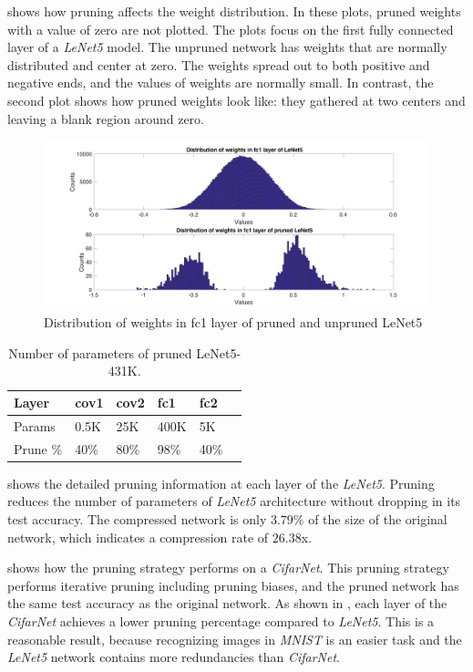 \documentclass[a4paper,12pt]{report}
\begin{document}
 shows how pruning affects the weight distribution.
In these plots, pruned weights with a value of zero are not plotted.
The plots focus on the first fully connected layer of a \textit{LeNet5} model.
The unpruned network has weights that are normally distributed and
center at zero.
The weights spread out to both positive and negative ends, and the values of
weights are normally small.
In contrast, the second plot shows how pruned weights look like: they gathered
at two centers and leaving a blank region around zero.

\begin{figure}[!h]
  \includegraphics[width=\textwidth]{distr_weights.pdf}
  \caption{Distribution of weights in fc1 layer of pruned and unpruned LeNet5}
  \label{fig:dist_weights}
\end{figure}

\begin{table}[!h]
\centering
\begin{tabular}{|l|l|l|l|l|l|}
\hline
Layer			&cov1	&cov2	&fc1	&fc2 		\\ \hline
Params		& 0.5K		&25K	&400K	&5K		\\
\hline
Prune \%	& 40\%		&80\%	&98\%	&40\%	\\
\hline
\end{tabular}
\caption{Number of parameters of pruned LeNet5-431K.}
\label{tab:LeNetPrune}
\end{table}

 shows the detailed pruning information at each layer of
the \textit{LeNet5}.
Pruning reduces the number of parameters of
\textit{LeNet5} architecture without dropping in its test accuracy.
The compressed network is only $3.79\%$ of the size of the original network,
which indicates a compression rate of $26.38$x.

 shows how the pruning strategy performs on a
\textit{CifarNet}.
This pruning strategy performs iterative pruning including pruning
biases, and the pruned network has the same test accuracy as the original
network.
As shown in , each layer of the \textit{CifarNet}
achieves a lower pruning percentage compared to \textit{LeNet5}.
This is a reasonable result, because
recognizing images in \textit{MNIST} is an easier task and the
\textit{LeNet5} network contains more redundancies than \textit{CifarNet}.
\end{document}
